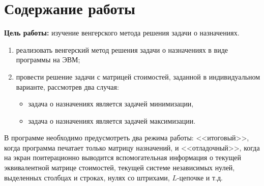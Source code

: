 \chapter{Содержание работы}

\textbf{Цель работы:} изучение венгерского метода решения задачи о назначениях.

\begin{enumerate}
    \item реализовать венгерский метод решения задачи о назначениях в виде программы на ЭВМ;
    \item провести решение задачи с матрицей стоимостей, заданной в индивидуальном варианте, рассмотрев два случая:
    \begin{itemize}
        \item [a)] задача о назначениях является задачей минимизации,
        \item [б)] задача о назначениях является задачей максимизации.
    \end{itemize}
\end{enumerate}

В программе необходимо предусмотреть два режима работы: <<итоговый>>, когда программа печатает только матрицу назначений, и <<отладочный>>, когда на экран поитерационно выводится вспомогательная информация о текущей эквивалентной матрице стоимостей, текущей системе независимых нулей, выделенных столбцах и строках, нулях со штрихами, $L$-цепочке и т.д.
